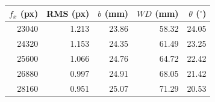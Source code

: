 \begin{tabular}{rrrrr}\toprule
$f_x$ (px) & RMS (px) & $b$ (mm) & $WD$ (mm) & $\theta$ ($^\circ$)\\\midrule
23040 & 1.213 & 23.86 & 58.32 & 24.05 \\
24320 & 1.153 & 24.35 & 61.49 & 23.25 \\
25600 & 1.066 & 24.76 & 64.72 & 22.42 \\
26880 & 0.997 & 24.91 & 68.05 & 21.42 \\
28160 & 0.951 & 25.07 & 71.29 & 20.53 \\
\bottomrule
\end{tabular}
